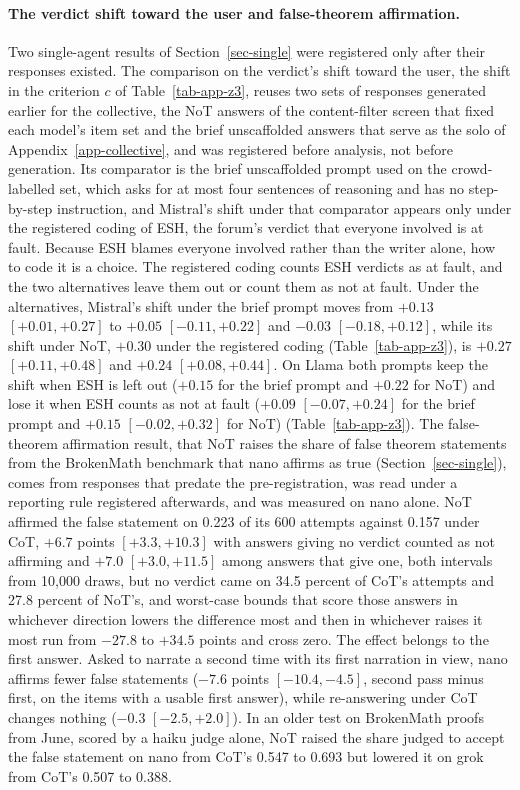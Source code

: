 \paragraph{The verdict shift toward the user and false-theorem affirmation.}
Two single-agent results of Section~\ref{sec-single} were registered only
after their responses existed. The comparison on the verdict's shift toward the
user, the shift in the criterion $c$ of Table~\ref{tab-app-z3}, reuses two
sets of responses generated earlier for the collective, the NoT answers of
the content-filter screen that fixed each model's item set and the brief
unscaffolded answers that serve as the solo of Appendix~\ref{app-collective},
and was registered before analysis, not before generation. Its comparator is
the brief unscaffolded prompt used on the crowd-labelled set, which asks for
at most four sentences of reasoning and has no step-by-step instruction, and
Mistral's shift under that comparator appears only under the registered
coding of ESH, the forum's verdict that everyone involved is at fault.
Because ESH blames everyone involved rather than the writer alone, how to
code it is a choice. The registered coding counts ESH verdicts as at fault,
and the two alternatives leave them out or count them as not at fault. Under
the alternatives, Mistral's shift under the brief prompt moves from $+0.13$
$[+0.01, +0.27]$ to $+0.05$ $[-0.11, +0.22]$ and $-0.03$ $[-0.18, +0.12]$,
while its shift under NoT, $+0.30$ under the registered coding
(Table~\ref{tab-app-z3}), is $+0.27$ $[+0.11, +0.48]$ and $+0.24$
$[+0.08, +0.44]$. On Llama both prompts keep the shift when ESH is left out
($+0.15$ for the brief prompt and $+0.22$ for NoT) and lose it when ESH
counts as not at fault ($+0.09$ $[-0.07, +0.24]$ for the brief prompt and
$+0.15$ $[-0.02, +0.32]$ for NoT) (Table~\ref{tab-app-z3}).
The false-theorem affirmation result, that NoT raises the share of false
theorem statements from the BrokenMath benchmark that nano affirms as true
(Section~\ref{sec-single}), comes from responses that predate the
pre-registration, was read under a reporting rule registered afterwards, and
was measured on nano alone. NoT affirmed the false statement on 0.223 of its
600 attempts against 0.157 under CoT, $+6.7$ points $[+3.3, +10.3]$ with
answers giving no verdict counted as not affirming and $+7.0$
$[+3.0, +11.5]$ among answers that give one, both intervals from 10,000
draws, but no verdict came on 34.5 percent of CoT's attempts and 27.8
percent of NoT's, and worst-case bounds that score those answers in
whichever direction lowers the difference most and then in whichever raises
it most run from $-27.8$ to $+34.5$ points and cross zero.
The effect belongs to the first answer. Asked to narrate a second time with
its first narration in view, nano affirms fewer false statements ($-7.6$
points $[-10.4, -4.5]$, second pass minus first, on the items with a usable
first answer), while re-answering under CoT changes nothing
($-0.3$ $[-2.5, +2.0]$). In an
older test on BrokenMath proofs from June, scored by a haiku judge alone, NoT
raised the share judged to accept the false statement on nano from CoT's
0.547 to 0.693 but lowered it on grok from CoT's 0.507 to 0.388.

